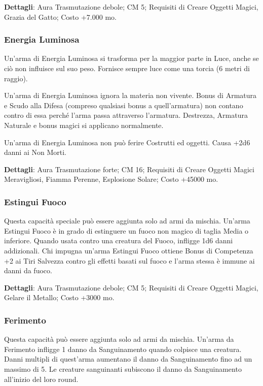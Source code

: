 \begin{multicols}{2}
\textbf{Dettagli}: Aura Trasmutazione debole; CM 5; Requisiti di Creare Oggetti Magici, Grazia del Gatto; Costo +7.000 mo.

\subsubsection{Energia Luminosa}

Un'arma di Energia Luminosa si trasforma per la maggior parte in Luce, anche se ciò non influisce sul suo peso. Fornisce sempre luce come una torcia (6 metri di raggio).

Un'arma di Energia Luminosa ignora la materia non vivente. Bonus di Armatura e Scudo alla Difesa (compreso qualsiasi bonus a quell'armatura) non contano contro di essa perché l'arma passa attraverso l'armatura.
Destrezza, Armatura Naturale e bonus magici si applicano normalmente.

Un'arma di Energia Luminosa non può ferire Costrutti ed oggetti. Causa +2d6 danni ai Non Morti.

\textbf{Dettagli}: Aura Trasmutazione forte; CM 16; Requisiti di Creare Oggetti Magici Meravigliosi, Fiamma Perenne, Esplosione Solare; Costo +45000 mo.

\subsubsection{Estingui Fuoco}

Questa capacità speciale può essere aggiunta solo ad armi da mischia. Un'arma Estingui Fuoco è in grado di estinguere un fuoco non magico di taglia Media o inferiore. Quando usata contro una creatura del Fuoco, infligge 1d6 danni addizionali. Chi impugna un'arma Estingui Fuoco ottiene Bonus di Competenza +2 ai Tiri Salvezza contro gli effetti basati sul fuoco e l'arma stessa è immune ai danni da fuoco.

\textbf{Dettagli}: Aura Trasmutazione debole; CM 5; Requisiti di Creare Oggetti Magici, Gelare il Metallo; Costo +3000 mo.

\subsubsection{Ferimento}

Questa capacità può essere aggiunta solo ad armi da mischia. Un'arma da Ferimento infligge 1 danno da Sanguinamento quando colpisce una creatura. Danni multipli di quest'arma aumentano il danno da Sanguinamento fino ad un massimo di 5.
Le creature sanguinanti subiscono il danno da Sanguinamento all'inizio del loro round.


\end{multicols}
